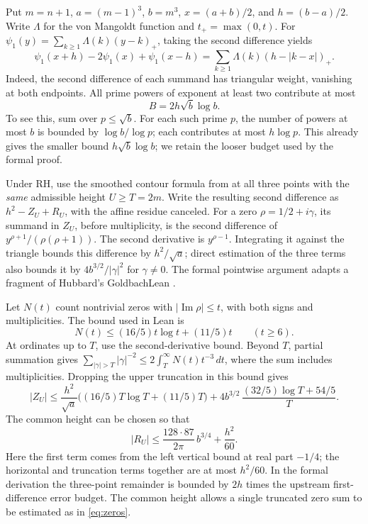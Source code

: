 \documentclass[10pt]{article}
\begin{document}
Put \(m=n+1\), \(a=(m-1)^3\), \(b=m^3\), \(x=(a+b)/2\), and \(h=(b-a)/2\). Write \(\Lambda\) for the von Mangoldt function and \(t_+=\max(0,t)\). For
\(\psi_1(y)=\sum_{k\ge1}\Lambda(k)(y-k)_+\), taking the second difference yields
\begin{equation}\label{eq:triangle}
\psi_1(x+h)-2\psi_1(x)+\psi_1(x-h)
 = \sum_{k\ge1}\Lambda(k)(h-|k-x|)_+ .
\end{equation}
Indeed, the second difference of each summand has triangular weight, vanishing at both endpoints. All prime powers of exponent at least two contribute at most
\begin{equation}\label{eq:budget}
B=2h\sqrt b\log b.
\end{equation}
To see this, sum over \(p\le\sqrt b\). For each such prime \(p\), the number of powers at most \(b\) is bounded by \(\log b/\log p\); each contributes at most \(h\log p\). This already gives the smaller bound \(h\sqrt b\log b\); we retain the looser budget used by the formal proof.

Under RH, use the smoothed contour formula from \cite{cryptids} at all three points with the \emph{same} admissible height \(U\ge T=2m\). Write the resulting second difference as \(h^2-Z_U+R_U\), with the affine residue canceled. For a zero \(\rho=1/2+i\gamma\), its summand in \(Z_U\), before multiplicity, is the second difference of \(y^{\rho+1}/(\rho(\rho+1))\). The second derivative is \(y^{\rho-1}\). Integrating it against the triangle bounds this difference by \(h^2/\sqrt a\); direct estimation of the three terms also bounds it by \(4b^{3/2}/|\gamma|^2\) for \(\gamma\ne0\). The formal
pointwise argument adapts a fragment of Hubbard's GoldbachLean \cite{hubbard}.

Let \(N(t)\) count nontrivial zeros with \(|\operatorname{Im}\rho|\le t\), with both signs and multiplicities. The bound used in Lean is
\[
N(t)\le (16/5)t\log t+(11/5)t\qquad (t\ge6).
\]
At ordinates up to \(T\), use the second-derivative bound. Beyond \(T\), partial summation gives
\(\sum_{|\gamma|>T}|\gamma|^{-2}\le 2\int_T^\infty N(t)t^{-3}\,dt\), where the sum includes multiplicities. Dropping the upper truncation in this bound gives
\begin{equation}\label{eq:zeros}
|Z_U|\le
 \frac{h^2}{\sqrt a}\bigl((16/5)T\log T+(11/5)T\bigr)
 +4b^{3/2}\,\frac{(32/5)\log T+54/5}{T}.
\end{equation}
The common height can be chosen so that
\begin{equation}\label{eq:remainder}
|R_U|\le \frac{128\cdot87}{2\pi}\,b^{3/4}+\frac{h^2}{60}.
\end{equation}
Here the first term comes from the left vertical bound at real part \(-1/4\); the horizontal and truncation terms together are at most \(h^2/60\). In the formal derivation the three-point remainder is bounded by \(2h\) times the upstream first-difference error budget. The common height allows a single truncated zero sum to be estimated as in \eqref{eq:zeros}.
\end{document}
